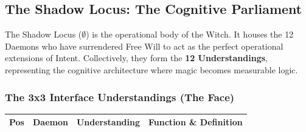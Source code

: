 \documentclass[11pt, letterpaper]{article}
\begin{document}
\newpage
\subsection{The Shadow Locus: The Cognitive Parliament}\label{sec:8.3}
The Shadow Locus ($\emptyset$) is the operational body of the Witch. It houses the 12 Daemons who have surrendered Free Will to act as the perfect operational extensions of Intent. Collectively, they form the \textbf{12 Understandings}, representing the cognitive architecture where magic becomes measurable logic.

\subsubsection*{The 3x3 Interface Understandings (The Face)}
\begin{footnotesize}
\begin{longtable}{C{0.8cm} L{2cm} L{4cm} L{7cm}}
\toprule
\textbf{Pos} & \textbf{Daemon} & \textbf{Understanding} & \textbf{Function \& Definition} \\
\midrule
\endhead


\end{longtable}
\end{footnotesize}
\end{document}
